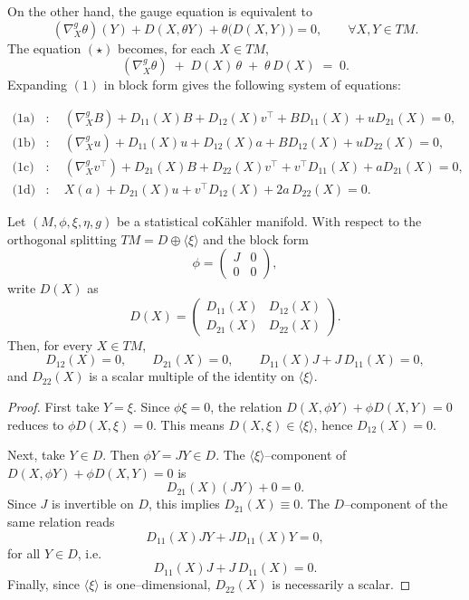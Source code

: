 On the other hand, the gauge equation is equivalent to
\begin{equation}
(\nabla^g_X \theta)(Y) + D(X,\theta Y) + \theta\big( D(X,Y) \big) = 0,
\qquad \forall X,Y \in TM.
\tag{$\star$}
\end{equation}
The equation \((\star)\) becomes, for each $X \in TM$,
\begin{equation}
(\nabla^g_X \theta) \;+\; D(X)\,\theta \;+\; \theta\,D(X) \;=\; 0.
\tag{1}
\end{equation}
Expanding \((1)\) in block form gives the following system of equations:

\begin{align}
\text{(1a)} &:\quad 
(\nabla^g_X B) + D_{11}(X) B + D_{12}(X) v^\top + B D_{11}(X) + u D_{21}(X) = 0,
\nonumber \\[4pt]
\text{(1b)} &:\quad 
(\nabla^g_X u) + D_{11}(X) u + D_{12}(X) a + B D_{12}(X) + u D_{22}(X) = 0,
\nonumber \\[4pt]
\text{(1c)} &:\quad 
(\nabla^g_X v^\top) + D_{21}(X) B + D_{22}(X) v^\top + v^\top D_{11}(X) + a D_{21}(X) = 0,
\nonumber \\[4pt]
\text{(1d)} &:\quad 
X(a) + D_{21}(X) u + v^\top D_{12}(X) + 2 a \, D_{22}(X) = 0.
\nonumber
\end{align}
\begin{lem}
Let $(M,\phi,\xi,\eta,g)$ be a statistical coK\"ahler manifold. 
With respect to the orthogonal splitting $TM = D \oplus \langle\xi\rangle$ and the block form
\[
\phi =
\begin{pmatrix}
J & 0\\
0 & 0
\end{pmatrix},
\]
write $D(X)$ as
\[
D(X) =
\begin{pmatrix}
D_{11}(X) & D_{12}(X)\\
D_{21}(X) & D_{22}(X)
\end{pmatrix}.
\]
Then, for every $X \in TM$,
\[
D_{12}(X) = 0, \qquad D_{21}(X) = 0, \qquad D_{11}(X)J + J\,D_{11}(X) = 0,
\]
and $D_{22}(X)$ is a scalar multiple of the identity on $\langle\xi\rangle$.
\end{lem}

\begin{proof}
First take $Y = \xi$. Since $\phi \xi = 0$, the relation $D(X,\phi Y) + \phi D(X,Y) = 0$ reduces to $\phi D(X,\xi) = 0$. This means $D(X,\xi) \in \langle\xi\rangle$, hence $D_{12}(X) = 0$.

Next, take $Y \in D$. Then $\phi Y = JY \in D$. The $\langle\xi\rangle$--component of $D(X,\phi Y) + \phi D(X,Y) = 0$ is
\[
D_{21}(X) (JY) + 0 = 0.
\]
Since $J$ is invertible on $D$, this implies $D_{21}(X) \equiv 0$.  
The $D$--component of the same relation reads
\[
D_{11}(X) JY + J D_{11}(X) Y = 0,
\]
for all $Y \in D$, i.e.
\[
D_{11}(X) J + J\,D_{11}(X) = 0.
\]
Finally, since $\langle\xi\rangle$ is one--dimensional, $D_{22}(X)$ is necessarily a scalar. 
\end{proof}

